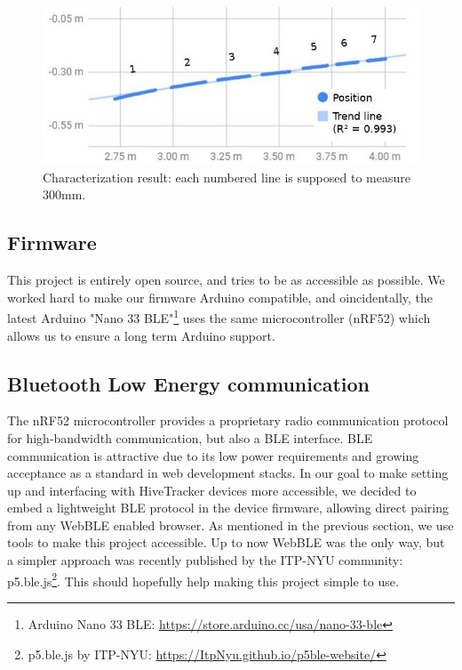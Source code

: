 \documentclass[sigchi]{acmart}
\begin{document}
\begin{figure}[h]
  \centering
  \includegraphics[width=\linewidth]{Figures/characterization_result.jpg}
  \caption{Characterization result: each numbered line is supposed to measure 300mm.}
  \label{Fig:characterization_result}
\end{figure}

\subsection{Firmware}

This project is entirely open source, and tries to be as accessible as possible.
We worked hard to make our firmware\cite{firmwarerepo} Arduino compatible, and oincidentally, the latest
Arduino "Nano 33 BLE"\footnote{Arduino Nano 33 BLE: \url{https://store.arduino.cc/usa/nano-33-ble}} uses the same microcontroller (nRF52) which allows us to ensure a long term Arduino support.


\subsection{Bluetooth Low Energy communication}

The nRF52 microcontroller provides a proprietary radio communication protocol for high-bandwidth communication, but also a BLE interface. BLE communication is attractive due to its low power requirements and growing acceptance as a standard in web development stacks. In our goal to make setting up and interfacing with HiveTracker devices more accessible, we decided to embed a lightweight BLE protocol in the device firmware, allowing direct pairing from any WebBLE enabled browser.
As mentioned in the previous section, we use tools to make this project accessible.
Up to now WebBLE was the only way, but a simpler approach was recently published by the ITP-NYU community: p5.ble.js\footnote{p5.ble.js by ITP-NYU: \url{https://ItpNyu.github.io/p5ble-website/}}.
This should hopefully help making this project simple to use.
\end{document}
